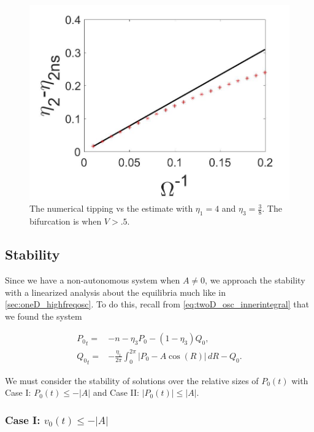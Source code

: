 \begin{figure}[H]
\centering
\includegraphics[scale=.25]{twoD/osc_Omegacomp.jpg}
\caption{The numerical tipping vs the estimate with $\eta_1=4$ and $\eta_3=\frac{3}{8}$. The bifurcation is when $V>.5$.}
\label{fig:twoD_osc_epscomp}
\end{figure}

\subsection{Stability}

Since we have a non-autonomous system when $A\not=0$, we approach the stability with a linearized analysis about the equilibria much like in \autoref{sec:oneD_highfreqosc}. To do this, recall from \eqref{eq:twoD_osc_innerintegral} that we found the system

\begin{equation}\label{eq:twoD_osc_stabilityequation}
\begin{aligned}
{P_0}_t =& -n -\eta_3 P_0-(1-\eta_3)Q_0,\\
{Q_0}_t =& -\frac{\eta_1}{2\pi}\int_0^{2\pi}|P_0-A\cos(R)|\, dR - Q_0.
\end{aligned}
\end{equation}

We must consider the stability of solutions over the relative sizes of $P_0(t)$ with Case I: $P_0(t)\le -|A|$ and Case II: $|P_0(t)|\le |A|$.

\subsubsection{Case I: $v_0(t)\le -|A|$}

